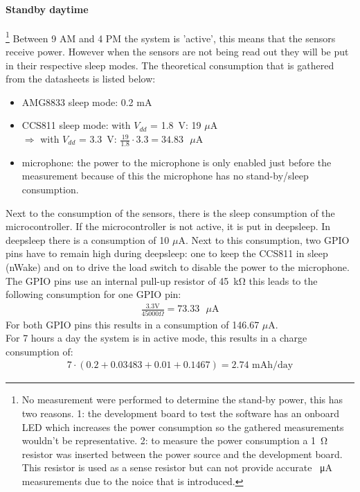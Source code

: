 \documentclass[11pt,a4paper]{article}
\begin{document}
\paragraph{Standby daytime}\footnote{No measurement were performed to determine the stand-by power, this has two reasons. 1: the development board to test the software has an onboard LED which increases the power consumption so the gathered measurements wouldn't be representative. 2: to measure the power consumption a \SI{1}{\ohm} resistor was inserted between the power source and the development board. This resistor is used as a sense resistor but can not provide accurate \SI{}{\micro\ampere} measurements due to the noice that is introduced. }
Between 9 AM and 4 PM the system is 'active', this means that the sensors receive power. However when the sensors are not being read out they will be put in their respective sleep modes. The theoretical consumption that is gathered from the datasheets is listed below:
\begin{itemize}
	\item AMG8833 sleep mode: 0.2 mA
	\item CCS811 sleep mode: with $V_{dd}$ = \SI{1.8}{\volt}: 19 $\mu$A \\$\Rightarrow$ with $V_{dd}$ = \SI{3.3}{\volt}: $\frac{19}{1.8}\cdot 3.3 = 34.83 \text{ }\mu\text{A}$
	\item microphone: the power to the microphone is only enabled just before the measurement because of this the microphone has no stand-by/sleep consumption. 
\end{itemize}
Next to the consumption of the sensors, there is the sleep consumption of the microcontroller. If the microcontroller is not active, it is put in deepsleep. In deepsleep there is a consumption of 10 $\mu$A. Next to this consumption, two GPIO pins have to remain high during deepsleep: one to keep the CCS811 in sleep (nWake) and on to drive the load switch to disable the power to the microphone. The GPIO pins use an internal pull-up resistor of \SI{45}{\kilo\ohm} this leads to the following consumption for one GPIO pin: 
\begin{gather*}
	\frac{3.3 \text{V}}{45000\Omega} = 73.33 \text{ } \mu\text{A} 
\end{gather*}
For both GPIO pins this results in a consumption of 146.67 $\mu$A.
\\
For 7 hours a day the system is in active mode, this results in a charge consumption of:
\begin{gather*}
	7 \cdot (0.2 + 0.03483 + 0.01 + 0.1467) = 2.74\text{ mAh/day}
\end{gather*}
\end{document}
